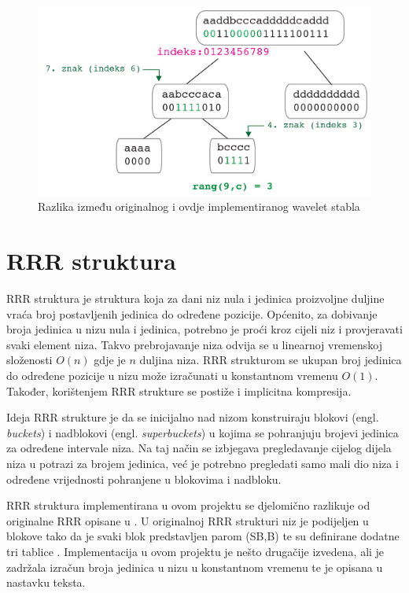 \begin{figure}[H]
\centering
\includegraphics[width=\linewidth]{./pictures/Waveletquery.jpg}
\caption{Razlika između originalnog i ovdje implementiranog wavelet stabla}\label{query}
\end{figure}


\section{RRR struktura}
RRR struktura je struktura koja za dani niz nula i jedinica proizvoljne duljine vraća broj postavljenih jedinica do određene pozicije. Općenito, za dobivanje broja jedinica u nizu nula i jedinica, potrebno je proći kroz cijeli niz i provjeravati svaki element niza. Takvo prebrojavanje niza odvija se u linearnoj vremenskoj složenosti $O(n)$ gdje je $n$ duljina niza. RRR strukturom se ukupan broj jedinica do određene pozicije u nizu može izračunati u konstantnom vremenu $O(1)$. Također, korištenjem RRR strukture se postiže i implicitna kompresija. 

Ideja RRR strukture je da se inicijalno nad nizom konstruiraju blokovi (engl. \textit{buckets}) i nadblokovi (engl. \textit{superbuckets}) u kojima se pohranjuju brojevi jedinica za određene intervale niza. Na taj način se izbjegava pregledavanje cijelog dijela niza u potrazi za brojem jedinica, već je potrebno pregledati samo mali dio niza i određene vrijednosti pohranjene u blokovima i nadbloku. 

RRR struktura implementirana u ovom projektu se djelomično razlikuje od originalne RRR opisane u \cite{rrr1}. U originalnoj RRR strukturi niz je podijeljen u blokove tako da je svaki blok predstavljen parom (SB,B) te su definirane dodatne tri tablice \cite{rrr2}. Implementacija u ovom projektu je nešto drugačije izvedena, ali je zadržala izračun broja jedinica u nizu u konstantnom vremenu te je opisana u nastavku teksta.

